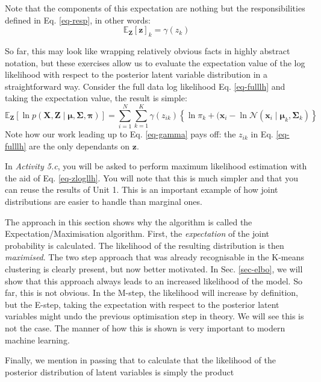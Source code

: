 Note that the components of this expectation are nothing but the responsibilities defined in Eq. \ref{eq-resp},
in other words:
\begin{equation}
\mathbb{E}_{\boldsymbol{Z}}[\boldsymbol{z}]_k = \gamma(z_k)
\label{eq-gamma}
\end{equation}

So far, this may look like wrapping relatively obvious facts in highly abstract notation, but these exercises allow us to evaluate the expectation value of the log likelihood
with respect to the posterior latent variable distribution in a straightforward way. Consider the full data log likelihood Eq. \ref{eq-fulllh} and taking the expectation value,
the result is simple:
\begin{equation}
  \mathbb{E}_{\boldsymbol{Z}}[\ln p( \boldsymbol{X}, \boldsymbol{Z} \mid \boldsymbol{\mu}, \boldsymbol{\Sigma}, \boldsymbol{\pi})] = \sum^N_{i=1} \sum^K_{k=1} \gamma( z_{ik} )
  \left\{ \ln \pi_k  + (\boldsymbol{x}_i - \ln \mathcal{N}( \boldsymbol{x}_i \mid \boldsymbol{\mu}_k, \boldsymbol{\Sigma}_k) \right\}
  \label{eq-zlogllh}
\end{equation}
Note how our work leading up to Eq. \ref{eq-gamma} pays off: the $z_{ik}$ in Eq. \ref{eq-fulllh} are the only dependants on $\boldsymbol{z}$.


In \emph{Activity 5.c}, you will be asked to perform maximum likelihood estimation with the aid of Eq. \ref{eq-zlogllh}. You will note that this is much simpler and
that you can reuse the results of Unit 1. This is an important example of how joint distributions are easier to handle than marginal ones.

The approach in this section shows why the algorithm is called the Expectation/Maximisation algorithm. First, the \emph{expectation} of the joint probability
is calculated. The likelihood of the resulting distribution is then \emph{maximised}. The two step approach that was already recognisable in the K-means
clustering is clearly present, but now better motivated. In Sec. \ref{sec-elbo}, we will show that this approach always leads to an increased likelihood of the model.
So far, this is not obvious. In the M-step, the likelihood will increase by definition, but the E-step, taking the expectation with respect to the posterior latent variables
might undo the previous optimisation step in theory. We will see this is not the case. The manner of how this is shown is very important to modern
machine learning.

Finally, we mention in passing that to calculate that the likelihood of the posterior distribution of latent variables is simply the product

